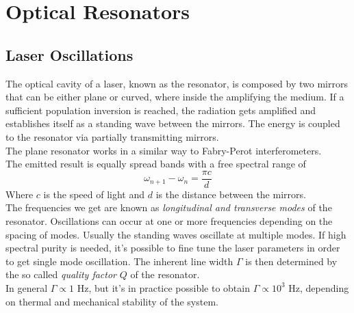\documentclass[../electromagnetism.tex]{subfiles}
\begin{document}
\section{Optical Resonators}
\subsection{Laser Oscillations}
The optical cavity of a laser, known as the resonator, is composed by two mirrors that can be either plane or curved, where inside the amplifying the medium. If a sufficient population inversion is reached, the radiation gets amplified and establishes itself as a standing wave between the mirrors. The energy is coupled to the resonator via partially transmitting mirrors.\\
The plane resonator works in a similar way to Fabry-Perot interferometers.\\
The emitted result is equally spread bands with a free spectral range of
\begin{equation}
	\omega_{n+1}-\omega_n=\frac{\pi c}{d}
	\label{eq:fsr.ores}
\end{equation}
Where $c$ is the speed of light and $d$ is the distance between the mirrors.\\
The frequencies we get are known as \textit{longitudinal and transverse modes} of the resonator. Oscillations can occur at one or more frequencies depending on the spacing of modes. Usually the standing waves oscillate at multiple modes. If high spectral purity is needed, it's possible to fine tune the laser parameters in order to get single mode oscillation. The inherent line width $\Gamma$ is then determined by the so called \textit{quality factor} $Q$ of the resonator.\\
In general $\Gamma\propto1$ Hz, but it's in practice possible to obtain $\Gamma\propto10^3$ Hz, depending on thermal and mechanical stability of the system.\\
\end{document}
